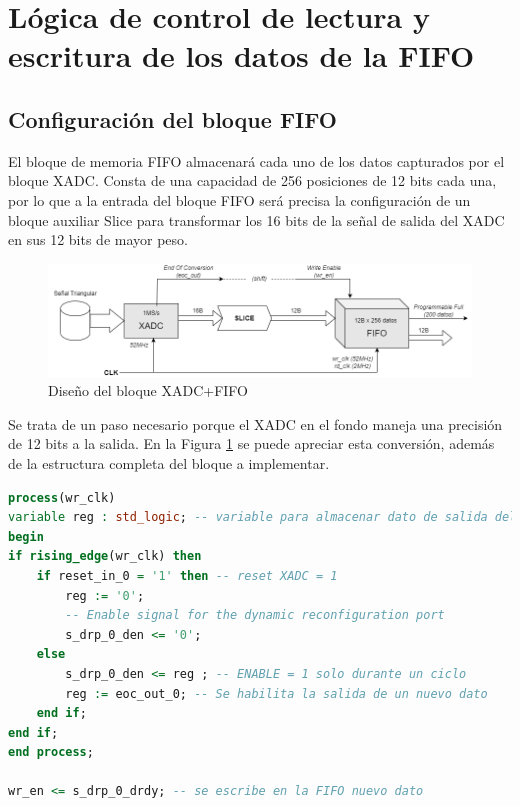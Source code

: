 \section{Lógica de control de lectura y escritura de los datos de la FIFO}

\subsection{Configuración del bloque FIFO}

El bloque de memoria FIFO almacenará cada uno de los datos capturados por el bloque XADC. Consta de una capacidad de 256 posiciones de 12 bits cada una, por lo que a la entrada del bloque FIFO será precisa la configuración de un bloque auxiliar Slice para transformar los 16 bits de la señal de salida del XADC en sus 12 bits de mayor peso. 

\vspace{3mm}

\begin{figure}[h]
    \centering
    \includegraphics[width=1\textwidth]{img/diseno/xadc_fifo.drawio.PNG}
    \caption{Diseño del bloque XADC+FIFO}
    \label{fig:xadc_fifo}
\end{figure}
    
\vspace{3mm}

Se trata de un paso necesario porque el XADC en el fondo maneja una precisión de 12 bits a la salida. En la Figura \ref*{fig:xadc_fifo} se puede apreciar esta conversión, además de la estructura completa del bloque a implementar.

\vspace{5mm}

\begin{lstlisting}[language=VHDL, style=mystyle, caption={Proceso de escritura}]
process(wr_clk) 
variable reg : std_logic; -- variable para almacenar dato de salida del xadc
begin
if rising_edge(wr_clk) then
    if reset_in_0 = '1' then -- reset XADC = 1
        reg := '0';
        -- Enable signal for the dynamic reconfiguration port
        s_drp_0_den <= '0'; 
    else
        s_drp_0_den <= reg ; -- ENABLE = 1 solo durante un ciclo
        reg := eoc_out_0; -- Se habilita la salida de un nuevo dato 
    end if;
end if;
end process; 

wr_en <= s_drp_0_drdy; -- se escribe en la FIFO nuevo dato 
\end{lstlisting}


